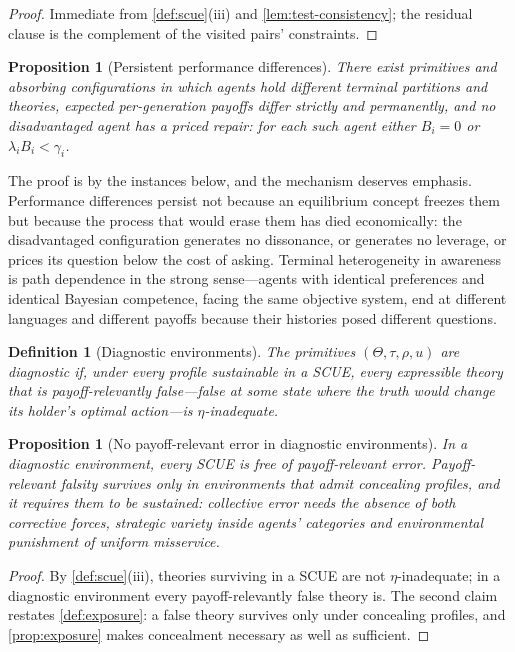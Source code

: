 \documentclass[11pt]{article}
\newtheorem{definition}[assumption]{Definition}
\newtheorem{proposition}[assumption]{Proposition}
\theoremstyle{definition}
\begin{document}
\begin{proof}
Immediate from \cref{def:scue}(iii) and \cref{lem:test-consistency}; the
residual clause is the complement of the visited pairs' constraints.
\end{proof}

\begin{proposition}[Persistent performance differences]
\label{prop:persistence}
There exist primitives and absorbing configurations in which agents hold
different terminal partitions and theories, expected per-generation payoffs
differ strictly and permanently, and no disadvantaged agent has a priced
repair: for each such agent either $B_i=0$ or $\lambda_iB_i<\gamma_i$.
\end{proposition}

The proof is by the instances below, and the mechanism deserves emphasis.
Performance differences persist not because an equilibrium concept freezes
them but because the process that would erase them has died economically:
the disadvantaged configuration generates no dissonance, or generates no
leverage, or prices its question below the cost of asking.  Terminal
heterogeneity in awareness is path dependence in the strong sense---agents
with identical preferences and identical Bayesian competence, facing the
same objective system, end at different languages and different payoffs
because their histories posed different questions.

\begin{definition}[Diagnostic environments]
\label{def:diagnostic}
The primitives $(\Theta,\tau,\rho,u)$ are \emph{diagnostic} if, under every
profile sustainable in a SCUE, every expressible theory that is
payoff-relevantly false---false at some state where the truth would change
its holder's optimal action---is $\eta$-inadequate.
\end{definition}

\begin{proposition}[No payoff-relevant error in diagnostic environments]
\label{prop:diagnostic}
In a diagnostic environment, every SCUE is free of payoff-relevant error.
Payoff-relevant falsity survives only in environments that admit concealing
profiles, and it requires them to be sustained: collective error needs the
absence of \emph{both} corrective forces, strategic variety inside agents'
categories and environmental punishment of uniform misservice.
\end{proposition}

\begin{proof}
By \cref{def:scue}(iii), theories surviving in a SCUE are not
$\eta$-inadequate; in a diagnostic environment every payoff-relevantly false
theory is.  The second claim restates \cref{def:exposure}: a false theory
survives only under concealing profiles, and \cref{prop:exposure} makes
concealment necessary as well as sufficient.
\end{proof}
\end{document}

